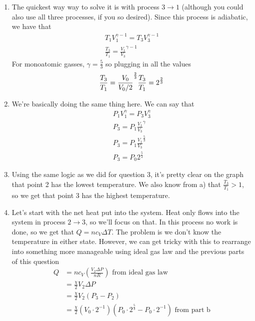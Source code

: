 \begin{enumerate}
    \begin{enumerate}
        \item The quickest way way to solve it is with process $3 \rightarrow 1$ (although you could also use all three processes, if you so desired). Since this process is adiabatic, we have that
        \begin{gather*}
            T_1V_1^{\gamma-1} = T_3V_3^{\gamma-1} \\
            \frac{T_3}{T_1} = \frac{V_1}{V_3}^{\gamma-1}
        \end{gather*}
        For monoatomic gasses, $\gamma = \frac{5}{3}$ so plugging in all the values
        \begin{equation*}
            \frac{T_3}{T_1} = \frac{V_0}{V_0/2}^{\frac{2}{3}} \\
            \frac{T_3}{T_1} = 2^{\frac{2}{3}}
        \end{equation*}
        \item We're basically doing the same thing here. We can say that 
        \begin{gather*}
            P_1V_1^{\gamma} = P_3V_3^{\gamma} \\
            P_3 = P_1\frac{V_1}{V_3}^{\gamma} \\
            P_3 = P_1\frac{V_1}{V_3}^{\frac{5}{3}} \\
            P_3 = P_0 2^{\frac{5}{3}}
        \end{gather*}
        \item Using the same logic as we did for question 3, it's pretty clear on the graph that point 2 has the lowest temperature. We also know from a) that $\frac{T_3}{T_1} > 1$, so we get that point 3 has the highest temperature.
        \item Let's start with the net heat put into the system. Heat only flows into the system in process $2 \rightarrow 3$, so we'll focus on that. In this process no work is done, so we get that $Q = nc_V\Delta T$. The problem is we don't know the temperature in either state. However, we can get tricky with this to rearrange into something more manageable using ideal gas law and the previous parts of this question
        \begin{align*}
            Q &= nc_V(\frac{V_2\Delta P}{nR}) \text{  from ideal gas law} \\
            &= \frac{\chi}{2}V_2\Delta P \\
            &= \frac{\chi}{2}V_2(P_3 - P_2) \\
            &= \frac{\chi}{2}(V_0\cdot 2^{-1})(P_0\cdot 2^{\frac{5}{3}} - P_0\cdot 2^{-1}) \text{  from part b} \\

\end{align*}
\end{enumerate}
\end{enumerate}
